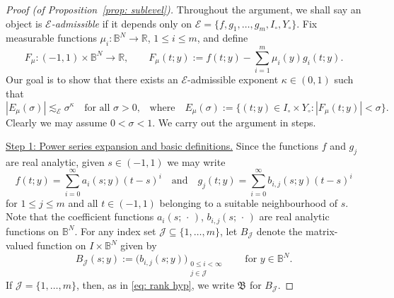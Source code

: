 \documentclass[reqno]{amsart}
\numberwithin{equation}{section}
\newcommand{\B}{\mathbb{B}}
\newcommand{\R}{\mathbb{R}}
\newcommand{\cJ}{\mathcal{J}}
\newcommand{\sE}{\mathscr{E}}
\newcommand{\fB}{\mathfrak{B}}
\theoremstyle{plain}
\theoremstyle{definition}
\begin{document}
\begin{proof}[Proof (of Proposition~\ref{prop: sublevel})] Throughout the argument, we shall say an object is \textit{$\sE$-admissible} if it depends only on $\sE = \{f, g_1, \dots, g_m, I_{\circ}, Y_{\circ}\}$. Fix measurable functions $\mu_i \colon \B^N \to \R$, $1 \leq i \leq m$, and define
\begin{equation*}
  F_{\mu} \colon (-1,1) \times \B^N \to \R, \qquad  F_{\mu}(t;y) := f(t;y) - \sum_{i=1}^m \mu_i(y) g_i(t;y). 
\end{equation*}
Our goal is to show that there exists an $\sE$-admissible exponent $\kappa \in (0,1)$ such that
\begin{equation*}
|E_{\mu}(\sigma)| \lesssim_{\sE} \sigma^{\kappa} \quad \textrm{for all $\sigma > 0$,} \quad \textrm{where} \quad E_{\mu}(\sigma) := \{(t; y) \in I_{\circ} \times Y_{\circ} : |F_{\mu}(t;y)| < \sigma\}.
\end{equation*}
Clearly we may assume $0 < \sigma < 1$. We carry out the argument in steps.\medskip




\noindent \underline{Step 1: Power series expansion and basic definitions.} Since the functions $f$ and $g_j$ are real analytic, given $s \in (-1,1)$ we may write
    \begin{equation}\label{eq: power series exp}
        f(t;y) = \sum_{i=0}^{\infty} a_i(s;y) (t-s)^i \quad \textrm{and} \quad g_j(t;y) = \sum_{i=0}^{\infty} b_{i, j}(s;y) (t-s)^i
    \end{equation}
    for $1 \leq j  \leq m$ and all $t \in (-1,1)$ belonging to a suitable neighbourhood of $s$. Note that the coefficient functions $a_i(s;\,\cdot\,)$, $b_{i,j}(s;\,\cdot\,)$ are real analytic functions on $\B^N$. For any index set $\cJ \subseteq \{1, \dots, m\}$, let $B_{\cJ}$ denote the matrix-valued function on $I \times \B^N$ given by 
    \begin{equation*}
        B_{\cJ}(s; y) := \big(b_{i,j}(s; y)\big)_{\substack{0 \leq i < \infty \\ j \in \cJ}} \qquad \textrm{for $y \in \B^N$}.
    \end{equation*}
    If $\cJ = \{1, \dots, m\}$, then, as in \eqref{eq: rank hyp}, we write $\fB$ for $B_{\cJ}$.
    

\end{proof}
\end{document}
